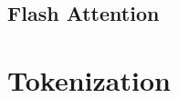 
\section{Flash Attention}
\label{sec:transformer:flash_attention}


\chapter{Tokenization}
\label{ch:transformer:tokenization}



